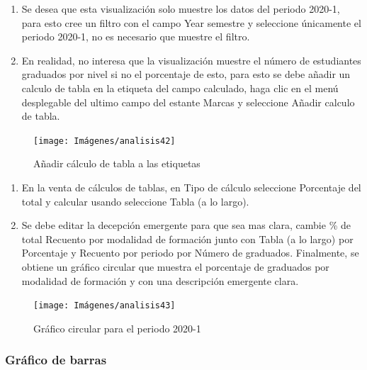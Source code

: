 \documentclass[
]{book}
\begin{document}
\begin{enumerate}
\def\labelenumi{\arabic{enumi}.}
\setcounter{enumi}{8}
\item
  Se desea que esta visualización solo muestre los datos del periodo 2020-1, para esto cree un filtro con el campo Year semestre y seleccione únicamente el periodo 2020-1, no es necesario que muestre el filtro.
\item
  En realidad, no interesa que la visualización muestre el número de estudiantes graduados por nivel si no el porcentaje de esto, para esto se debe añadir un calculo de tabla en la etiqueta del campo calculado, haga clic en el menú desplegable del ultimo campo del estante Marcas y seleccione Añadir calculo de tabla.
\end{enumerate}

\begin{figure}

{\centering \texttt{[image: Imágenes/analisis42]} 

}

\caption{Añadir cálculo de tabla a las etiquetas}\label{fig:paso10graficocircular-fig}
\end{figure}

\begin{enumerate}
\def\labelenumi{\arabic{enumi}.}
\setcounter{enumi}{10}
\item
  En la venta de cálculos de tablas, en Tipo de cálculo seleccione Porcentaje del total y calcular usando seleccione Tabla (a lo largo).
\item
  Se debe editar la decepción emergente para que sea mas clara, cambie \% de total Recuento por modalidad de formación junto con Tabla (a lo largo) por Porcentaje y Recuento por periodo por Número de graduados. Finalmente, se obtiene un gráfico circular que muestra el porcentaje de graduados por modalidad de formación y con una descripción emergente clara.
\end{enumerate}

\begin{figure}

{\centering \texttt{[image: Imágenes/analisis43]} 

}

\caption{Gráfico circular para el periodo 2020-1}\label{fig:graficocircularfinal-fig}
\end{figure}

\hypertarget{graficodebarras}{%
\subsubsection{Gráfico de barras}\label{graficodebarras}}
\end{document}
